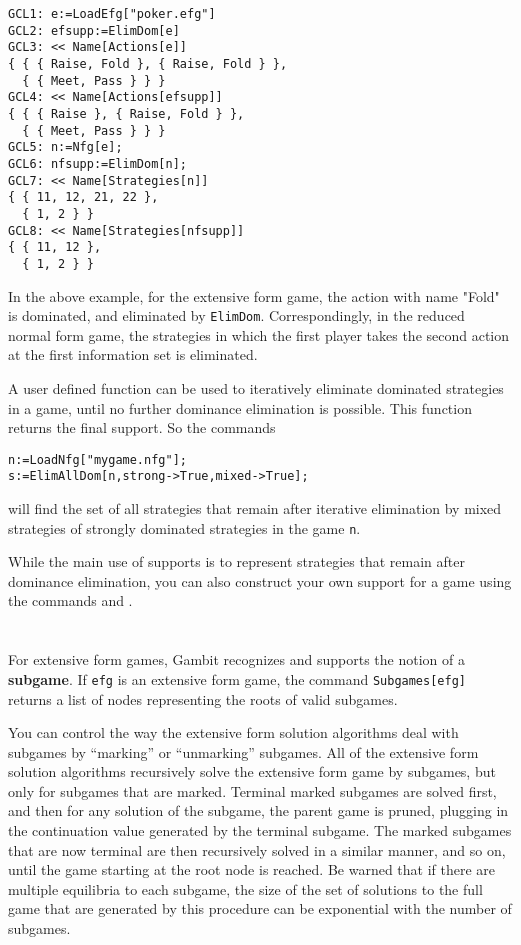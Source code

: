 \begin{verbatim}
GCL1: e:=LoadEfg["poker.efg"]
GCL2: efsupp:=ElimDom[e]
GCL3: << Name[Actions[e]]
{ { { Raise, Fold }, { Raise, Fold } },
  { { Meet, Pass } } }
GCL4: << Name[Actions[efsupp]]
{ { { Raise }, { Raise, Fold } },
  { { Meet, Pass } } }
GCL5: n:=Nfg[e];
GCL6: nfsupp:=ElimDom[n];
GCL7: << Name[Strategies[n]]
{ { 11, 12, 21, 22 },
  { 1, 2 } }
GCL8: << Name[Strategies[nfsupp]]
{ { 11, 12 },
  { 1, 2 } }
\end{verbatim}

In the above example, for the extensive form game, the action with
name "Fold" is dominated, and eliminated by \verb+ElimDom+.
Correspondingly, in the reduced normal form game, the strategies in
which the first player takes the second action at the first
information set is eliminated.  

A user defined function  can be used to iteratively
eliminate dominated strategies in a game, until no further dominance
elimination is possible.  This function returns the final support.  So
the commands

\begin{verbatim}
n:=LoadNfg["mygame.nfg"];
s:=ElimAllDom[n,strong->True,mixed->True];
\end{verbatim}

\noindent
will find the set of all strategies that remain after iterative
elimination by mixed strategies of strongly dominated strategies in
the game \verb+n+.

While the main use of supports is to represent strategies that
remain after dominance elimination, you can also construct your own
support for a game using the commands  and
.

\section{}

For extensive form games, Gambit recognizes and supports the notion of
a {\bf subgame}.  If \verb+efg+ is an extensive form game, the
command \verb+Subgames[efg]+ returns a list of nodes
representing the roots of valid subgames.

You can control the way the extensive form solution algorithms deal
with subgames by ``marking'' or ``unmarking'' subgames.  All of the
extensive form solution algorithms recursively solve the extensive
form game by subgames, but only for subgames that are marked.  Terminal
marked subgames are solved first, and then for any solution of the
subgame, the parent game is pruned, plugging in the continuation value
generated by the terminal subgame.  The marked subgames that are now
terminal are then recursively solved in a similar manner, and so on,
until the game starting at the root node is reached.  Be warned that
if there are multiple equilibria to each subgame, the size of the set
of solutions to the full game that are generated by this procedure can
be exponential with the number of subgames.

